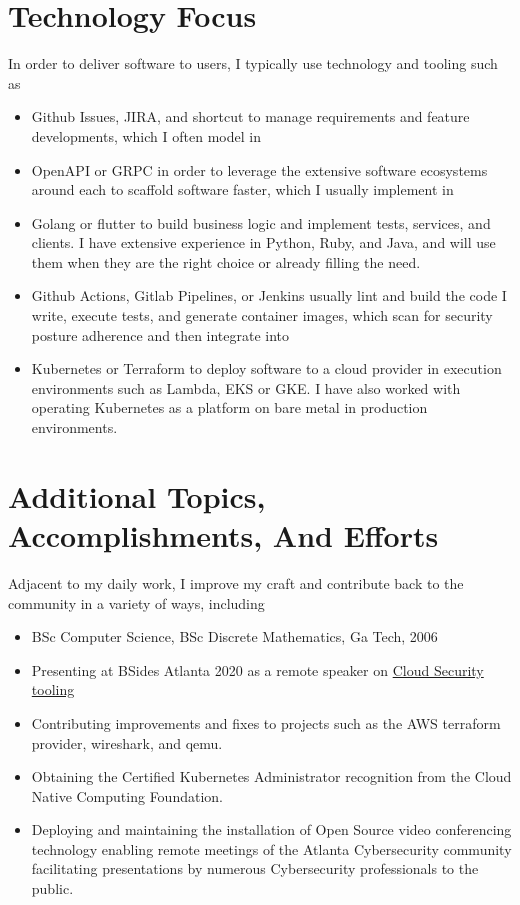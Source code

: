 \documentclass[letterpaper,10pt]{article}
\begin{document}
\section{Technology Focus}
In order to deliver software to users, I typically use technology and tooling such as
\begin{itemize}
	\setlength\itemsep{0.1em}
	\item Github Issues, JIRA, and shortcut to manage requirements and feature developments, which I often model in
	\item OpenAPI or GRPC in order to leverage the extensive software ecosystems around each to scaffold software faster, which I usually implement in
	\item Golang or flutter to build business logic and implement tests, services, and clients.  I have extensive experience in Python, Ruby, and Java, and will use them when they are the right choice or already filling the need.
	\item Github Actions, Gitlab Pipelines, or Jenkins usually lint and build the code I write, execute tests, and generate container images, which scan for security posture adherence and then integrate into
	\item Kubernetes or Terraform to deploy software to a cloud provider in execution environments such as Lambda, EKS or GKE. I have also worked with operating Kubernetes as a platform on bare metal in production environments.
\end{itemize}

\section{Additional Topics, Accomplishments, And Efforts}
Adjacent to my daily work, I improve my craft and contribute back to the community in a variety of ways, including
\begin{itemize}
	\setlength\itemsep{0.1em}
	\item BSc Computer Science, BSc Discrete Mathematics, Ga Tech, 2006
	\item Presenting at BSides Atlanta 2020 as a remote speaker on \href{https://www.youtube.com/watch?v=kLCaAaUd1mM}{\color{blue}Cloud Security tooling}
	\item Contributing improvements and fixes to projects such as the AWS terraform provider, wireshark, and qemu.
	\item Obtaining the Certified Kubernetes Administrator recognition from the Cloud Native Computing Foundation.
	\item Deploying and maintaining the installation of Open Source video conferencing technology enabling remote meetings of the Atlanta Cybersecurity community facilitating presentations by numerous Cybersecurity professionals to the public.
\end{itemize}
\end{document}
